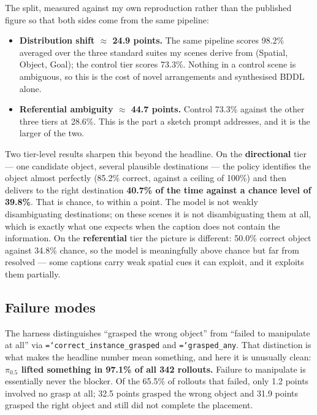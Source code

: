 \documentclass[11pt,a4paper]{article}
\newcommand{\code}[1]{\texttt{\small\hyphenchar\font=`\-\relax #1}}
\begin{document}
\noindent
The split, measured against my own reproduction rather than the published
figure so that both sides come from the same pipeline:

\begin{itemize}
  \item \textbf{Distribution shift $\approx$ 24.9 points.} The same pipeline
    scores 98.2\% averaged over the three standard suites my scenes derive from
    (Spatial, Object, Goal); the control tier scores 73.3\%. Nothing in a
    control scene is ambiguous, so this is the cost of novel arrangements and
    synthesised BDDL alone.
  \item \textbf{Referential ambiguity $\approx$ 44.7 points.} Control 73.3\%
    against the other three tiers at 28.6\%. This is the part a sketch prompt
    addresses, and it is the larger of the two.
\end{itemize}

\noindent
Two tier-level results sharpen this beyond the headline. On the
\textbf{directional} tier --- one candidate object, several plausible
destinations --- the policy identifies the object almost perfectly (85.2\%
correct, against a ceiling of 100\%) and then delivers to the right destination
\textbf{40.7\% of the time against a chance level of 39.8\%}. That is chance, to
within a point. The model is not weakly disambiguating destinations; on these
scenes it is not disambiguating them at all, which is exactly what one expects
when the caption does not contain the information. On the \textbf{referential}
tier the picture is different: 50.0\% correct object against 34.8\% chance, so
the model is meaningfully above chance but far from resolved --- some captions
carry weak spatial cues it can exploit, and it exploits them partially.

\subsection{Failure modes}

The harness distinguishes ``grasped the wrong object'' from ``failed to
manipulate at all'' via \code{correct\_instance\_grasped} and
\code{grasped\_any}. That distinction is what makes the headline number mean
something, and here it is unusually clean:
\textbf{$\pi_{0.5}$ lifted something in 97.1\% of all 342 rollouts.} Failure to
manipulate is essentially never the blocker. Of the 65.5\% of rollouts that
failed, only 1.2 points involved no grasp at all; 32.5 points grasped the wrong
object and 31.9 points grasped the right object and still did not complete the
placement.
\end{document}

